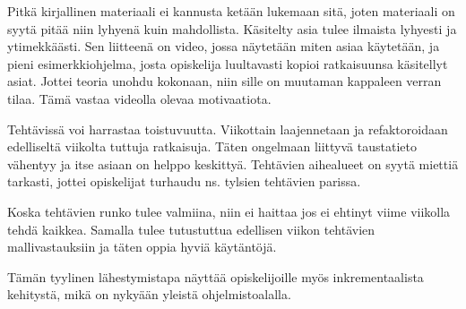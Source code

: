 Pitkä kirjallinen materiaali ei kannusta ketään lukemaan sitä, joten materiaali
on syytä pitää niin lyhyenä kuin mahdollista. Käsitelty asia tulee ilmaista
lyhyesti ja ytimekkäästi. Sen liitteenä on video, jossa näytetään miten asiaa
käytetään, ja pieni esimerkkiohjelma, josta opiskelija luultavasti kopioi
ratkaisuunsa käsitellyt asiat. Jottei teoria unohdu kokonaan, niin sille on
muutaman kappaleen verran tilaa. Tämä vastaa videolla olevaa motivaatiota.

Tehtävissä voi harrastaa toistuvuutta. Viikottain laajennetaan ja refaktoroidaan
edelliseltä viikolta tuttuja ratkaisuja. Täten ongelmaan liittyvä taustatieto
vähentyy ja itse asiaan on helppo keskittyä. Tehtävien aihealueet on syytä
miettiä tarkasti, jottei opiskelijat turhaudu ns. tylsien tehtävien parissa.

Koska tehtävien runko tulee valmiina, niin ei haittaa jos ei ehtinyt viime
viikolla tehdä kaikkea. Samalla tulee tutustuttua edellisen viikon tehtävien
mallivastauksiin ja täten oppia hyviä käytäntöjä.

Tämän tyylinen lähestymistapa näyttää opiskelijoille myös inkrementaalista
kehitystä, mikä on nykyään yleistä ohjelmistoalalla.
